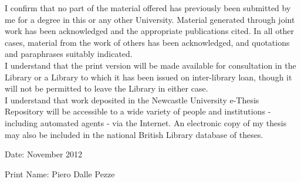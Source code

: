 \newcommand{\copyrightstatement}{
    \begin{textblock}{11.0}(2.8,11.9)    %
         \footnotesize
         \begin{center}
	  \textbf{COPYRIGHT}   
         \end{center}
	 Attention is drawn to the fact that copyright of this thesis rests with the author. A copy of this thesis has been supplied on condition that anyone who consults it is understood to recognise that its copyright rests with the author and that they must not copy it or use material from it except as permitted by law or with the consent of the author.

    \end{textblock}
}


\graphicspath{{Declaration/DeclarationFigs/}}

\begin{declaration}
I confirm that no part of the material offered has previously been submitted by me for a degree in this or any other University. Material generated through joint work has been acknowledged and the appropriate publications cited. In all other cases, material from the work of others has been acknowledged, and quotations and paraphrases suitably indicated.\\
I understand that the print version will be made available for consultation in the Library or a Library to which it has been issued on inter-library loan, though it will not be permitted to leave the Library in either case.\\
I understand that work deposited in the Newcastle University e-Thesis Repository will be
accessible to a wide variety of people and institutions - including automated agents - via the
Internet. An electronic copy of my thesis may also be included in the national British Library
database of theses.
\newline

Date: \;\;\;\;\;\;\;\;\;\;\; November 2012

Print Name: \;\; Piero Dalle Pezze \\



\end{declaration}





